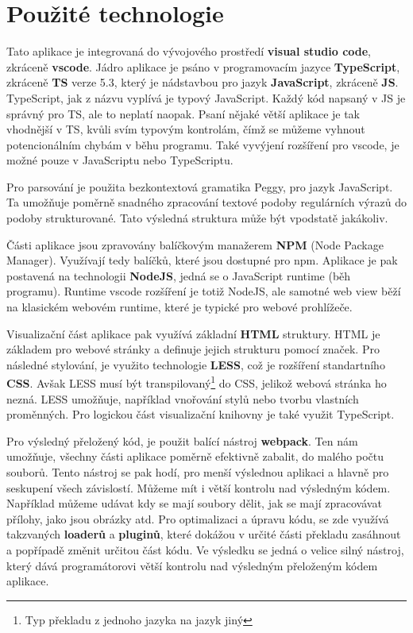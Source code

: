 \newpage

\section{Použité technologie}\label{sec:USEDtech}
Tato aplikace je integrovaná do vývojového prostředí \textbf{visual studio code}, 
zkráceně \textbf{vscode}. Jádro aplikace je psáno v programovacím jazyce \textbf{TypeScript}, zkráceně \textbf{TS} verze 5.3, který je nádstavbou
pro jazyk \textbf{JavaScript}, zkráceně \textbf{JS}. TypeScript, jak z názvu vyplívá je typový JavaScript.
Každý kód napsaný v JS je správný pro TS, ale to neplatí naopak.
Psaní nějaké větší aplikace je tak vhodnější v TS, 
kvůli svím typovým kontrolám, čímž se můžeme vyhnout potencionálním chybám v běhu programu.
Také vyvýjení rozšíření pro vscode, je možné pouze v JavaScriptu nebo TypeScriptu.

Pro parsování je použita bezkontextová gramatika Peggy\cite{Peggy, Peggyjs}, pro jazyk JavaScript.
Ta umožňuje poměrně snadného zpracování textové podoby regulárních výrazů do podoby strukturované.
Tato výsledná struktura může být vpodstatě jakákoliv.

Části aplikace jsou zpravovány balíčkovým manažerem \textbf{NPM} (Node Package Manager).
Využívají tedy balíčků, které jsou dostupné pro npm. 
Aplikace je pak postavená na technologii \textbf{NodeJS}, 
jedná se o JavaScript runtime (běh programu). 
Runtime vscode rozšíření je totiž NodeJS, ale samotné web view běží na klasickém webovém runtime, které je typické pro webové prohlížeče.

Visualizační část aplikace pak využívá základní \textbf{HTML} struktury.  
HTML je základem pro webové stránky a definuje jejich strukturu pomocí značek.
Pro následné stylování, je využito technologie \textbf{LESS}, což je rozšíření standartního \textbf{CSS}.
Avšak LESS musí být transpilovaný\footnote{Typ překladu z jednoho jazyka na jazyk jiný} do CSS, jelikož webová stránka ho nezná. 
LESS umožňuje, například vnořování stylů nebo tvorbu vlastních proměnných.
Pro logickou část visualizační knihovny je také využit TypeScript.

Pro výsledný přeložený kód, je použit balící nástroj \textbf{webpack}.
Ten nám umožňuje, všechny části aplikace poměrně efektivně zabalit, do malého počtu souborů. 
Tento nástroj se pak hodí, pro menší výslednou aplikaci a hlavně pro seskupení všech závislostí.
Můžeme mít i větší kontrolu nad výsledným kódem.
Například můžeme udávat kdy se mají soubory dělit, jak se mají zpracovávat přílohy, jako jsou obrázky atd.
Pro optimalizaci a úpravu kódu, se zde využívá takzvaných \textbf{loaderů} a \textbf{pluginů}, 
které dokážou v určité části překladu zasáhnout a popřípadě změnit určitou část kódu.
Ve výsledku se jedná o velice silný nástroj, který dává programátorovi větší kontrolu nad výsledným přeloženým kódem aplikace.

